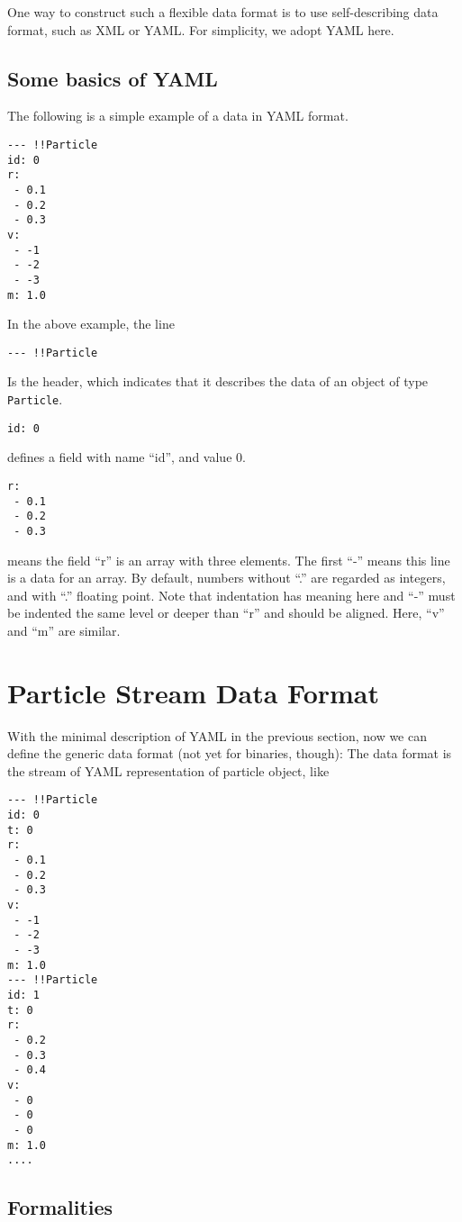 \documentclass[12pt]{article}
\begin{document}
One way to construct such a flexible data format is to use
self-describing data format, such as XML or YAML. For simplicity,
we adopt YAML here.

\subsection{Some basics of YAML}

The following is a simple example of a data in YAML format.


\begin{verbatim}
--- !!Particle
id: 0
r:
 - 0.1
 - 0.2
 - 0.3
v:
 - -1
 - -2
 - -3
m: 1.0
\end{verbatim}

In the above example, the line

\begin{verbatim}
--- !!Particle
\end{verbatim}
Is the header, which indicates that it describes the data of an object
of type {\tt Particle}.


\begin{verbatim}
id: 0
\end{verbatim}
defines a field with name ``id'', and value 0.
\begin{verbatim}
r:
 - 0.1
 - 0.2
 - 0.3
\end{verbatim}
means the field ``r'' is an array with three elements. The
first ``-'' means this line is a data for an array.
By default, numbers without ``.'' are regarded as integers, and with
``.'' floating point. Note that indentation has meaning here and ``-''
must be indented the same level or deeper than ``r'' and should be aligned.
Here,  ``v'' and ``m'' are similar.


\section{Particle Stream Data Format}


With the  minimal description of YAML in the previous section, now
we can define the generic data format (not yet for binaries, though):
The data format is the stream of YAML representation of particle
object, like

\begin{verbatim}
--- !!Particle
id: 0
t: 0
r:
 - 0.1
 - 0.2
 - 0.3
v:
 - -1
 - -2
 - -3
m: 1.0
--- !!Particle
id: 1
t: 0
r:
 - 0.2
 - 0.3
 - 0.4
v:
 - 0
 - 0
 - 0
m: 1.0
....
\end{verbatim}

\subsection{Formalities}
\end{document}
